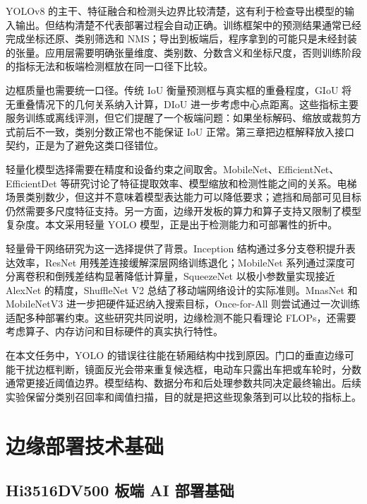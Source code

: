 YOLOv8 的主干、特征融合和检测头边界比较清楚，这有利于检查导出模型的输入输出。但结构清楚不代表部署过程会自动正确。训练框架中的预测结果通常已经完成坐标还原、类别筛选和 NMS；导出到板端后，程序拿到的可能只是未经封装的张量。应用层需要明确张量维度、类别数、分数含义和坐标尺度，否则训练阶段的指标无法和板端检测框放在同一口径下比较。

边框质量也需要统一口径。传统 IoU 衡量预测框与真实框的重叠程度，GIoU 将无重叠情况下的几何关系纳入计算\cite{rezatofighi2019giou}，DIoU 进一步考虑中心点距离\cite{zheng2020diou}。这些指标主要服务训练或离线评测，但它们提醒了一个板端问题：如果坐标解码、缩放或裁剪方式前后不一致，类别分数正常也不能保证 IoU 正常。第三章把边框解释放入接口契约，正是为了避免这类口径错位。

轻量化模型选择需要在精度和设备约束之间取舍。MobileNet、EfficientNet、EfficientDet 等研究讨论了特征提取效率、模型缩放和检测性能之间的关系\cite{howard2019mobilenetv3,tan2019efficientnet,tan2020efficientdet}。电梯场景类别数少，但这并不意味着模型表达能力可以降低要求；遮挡和局部可见目标仍然需要多尺度特征支持。另一方面，边缘开发板的算力和算子支持又限制了模型复杂度。本文采用轻量 YOLO 模型，正是出于检测能力和可部署性的折中。

轻量骨干网络研究为这一选择提供了背景。Inception 结构通过多分支卷积提升表达效率\cite{szegedy2015inception}，ResNet 用残差连接缓解深层网络训练退化\cite{he2016resnet}；MobileNet 系列通过深度可分离卷积和倒残差结构显著降低计算量\cite{howard2017mobilenets}\cite{sandler2018mobilenetv2}，SqueezeNet 以极小参数量实现接近 AlexNet 的精度\cite{iandola2016squeezenet}，ShuffleNet V2 总结了移动端网络设计的实际准则\cite{ma2018shufflenetv2}。MnasNet 和 MobileNetV3 进一步把硬件延迟纳入搜索目标\cite{tan2018mnasnet}\cite{howard2019mobilenetv3}，Once-for-All 则尝试通过一次训练适配多种部署约束\cite{cai2019onceforall}。这些研究共同说明，边缘检测不能只看理论 FLOPs，还需要考虑算子、内存访问和目标硬件的真实执行特性。

在本文任务中，YOLO 的错误往往能在轿厢结构中找到原因。门口的垂直边缘可能干扰边框判断，镜面反光会带来重复候选框，电动车只露出车把或车轮时，分数通常更接近阈值边界。模型结构、数据分布和后处理参数共同决定最终输出。后续实验保留分类别召回率和阈值扫描，目的就是把这些现象落到可以比较的指标上。

\section{边缘部署技术基础}

\subsection{Hi3516DV500 板端 AI 部署基础}

